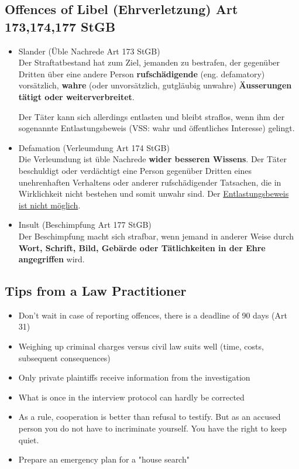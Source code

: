 \documentclass[11pt]{article}
\theoremstyle{definition}
\begin{document}
\subsection{Offences of Libel (Ehrverletzung) Art 173,174,177 StGB}
\begin{itemize}
	\item Slander (Üble Nachrede Art 173 StGB)\\
	Der Straftatbestand hat zum Ziel, jemanden zu bestrafen, der gegenüber Dritten über eine andere Person \textbf{rufschädigende} (eng. defamatory) vorsätzlich, \textbf{wahre} (oder unvorsätzlich, gutgläubig unwahre) \textbf{Äusserungen tätigt oder weiterverbreitet}.
	
	Der Täter kann sich allerdings entlasten und bleibt straflos, wenn ihm der sogenannte Entlastungsbeweis (VSS: wahr und öffentliches Interesse) gelingt.
	
	\item Defamation (Verleumdung Art 174 StGB)\\
	Die Verleumdung ist üble Nachrede \textbf{wider besseren Wissens}. Der Täter beschuldigt oder verdächtigt eine Person gegenüber Dritten eines unehrenhaften Verhaltens oder anderer rufschädigender Tatsachen, die in Wirklichkeit nicht bestehen und somit unwahr sind. Der \underline{Entlastungsbeweis ist nicht möglich}.
	
	\item Insult (Beschimpfung Art 177 StGB)\\
	Der Beschimpfung macht sich strafbar, wenn jemand in anderer Weise durch \textbf{Wort, Schrift, Bild, Gebärde oder Tätlichkeiten in der Ehre angegriffen} wird.
\end{itemize}

\subsection{Tips from a Law Practitioner}
\begin{itemize}
	\item Don't wait in case of reporting offences, there is a deadline of 90 days (Art 31)
	\item Weighing up criminal charges versus civil law suits well (time, costs, subsequent consequences)
	\item Only private plaintiffs receive information from the investigation
	\item What is once in the interview protocol can hardly be corrected
	\item As a rule, cooperation is better than refusal to testify. But as an accused person you do not have to incriminate yourself. You have the right to keep quiet.
	\item Prepare an emergency plan for a "house search"
\end{itemize}
\end{document}
